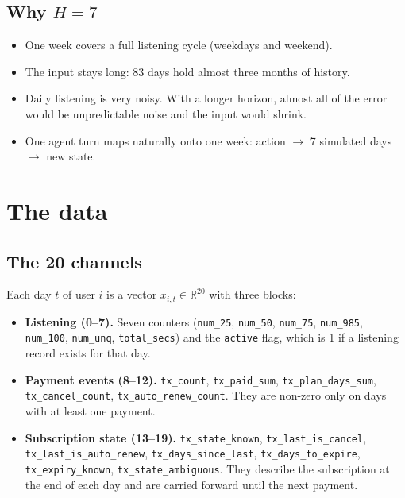 \documentclass[11pt]{article}
\newcommand{\R}{\mathbb{R}}
\newcommand{\code}[1]{\texttt{#1}}
\begin{document}
\subsection{Why $H = 7$}

\begin{itemize}
  \item One week covers a full listening cycle (weekdays and weekend).
  \item The input stays long: 83 days hold almost three months of history.
  \item Daily listening is very noisy. With a longer horizon, almost all of the error would be unpredictable noise and the input would shrink.
  \item One agent turn maps naturally onto one week: action $\to$ 7 simulated days $\to$ new state.
\end{itemize}

\section{The data}

\subsection{The 20 channels}

Each day $t$ of user $i$ is a vector $x_{i,t} \in \R^{20}$ with three blocks:

\begin{itemize}
  \item \textbf{Listening (0--7).} Seven counters (\code{num\_25}, \code{num\_50}, \code{num\_75}, \code{num\_985}, \code{num\_100}, \code{num\_unq}, \code{total\_secs}) and the \code{active} flag, which is 1 if a listening record exists for that day.
  \item \textbf{Payment events (8--12).} \code{tx\_count}, \code{tx\_paid\_sum}, \code{tx\_plan\_days\_sum}, \code{tx\_cancel\_count}, \code{tx\_auto\_renew\_count}. They are non-zero only on days with at least one payment.
  \item \textbf{Subscription state (13--19).} \code{tx\_state\_known}, \code{tx\_last\_is\_cancel}, \code{tx\_last\_is\_auto\_renew}, \code{tx\_days\_since\_last}, \code{tx\_days\_to\_expire}, \code{tx\_expiry\_known}, \code{tx\_state\_ambiguous}. They describe the subscription at the end of each day and are carried forward until the next payment.
\end{itemize}
\end{document}
